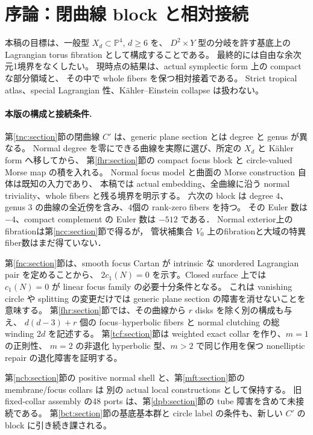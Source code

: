 \documentclass[11pt,a4paper]{article}
\theoremstyle{definition}
\newcommand{\PP}{\mathbb P}
\begin{document}
\section*{序論：閉曲線 block と相対接続}

本稿の目標は、一般型 $X_d\subset\PP^4$, $d\ge6$ を、
$D^2\times Y$ 型の分岐を許す基底上の Lagrangian torus fibration として構成することである。
最終的には自由な余次元1境界をなくしたい。
現時点の結果は、actual symplectic form 上の compact な部分領域と、
その中で whole fibers を保つ相対接着である。
Strict tropical atlas、special Lagrangian 性、Kähler--Einstein collapse は扱わない。

\paragraph{本版の構成と接続条件.}
第\ref{tnc:section}節の閉曲線 $C'$ は、generic plane section とは degree と genus が異なる。
Normal degree を零にできる曲線を実際に選び、所定の $X_d$ と K\"ahler form へ移してから、
第\ref{fhr:section}節の compact focus block と circle-valued Morse map の積を入れる。
Normal focus model と曲面の Morse construction 自体は既知の入力であり、
本稿では actual embedding、全曲線に沿う normal triviality、whole fibers と残る境界を明示する。
六次の block は degree $4$、genus $3$ の曲線の全近傍を含み、4個の rank-zero fibers を持つ。
その Euler 数は $-4$、compact complement の Euler 数は $-512$ である．
Normal exterior上のfibrationは第\ref{ncc:section}節で得るが，
管状補集合 $V_0$ 上のfibrationと大域の特異fiber数はまだ得ていない．

第\ref{fnc:section}節は、smooth focus Cartan が intrinsic な unordered Lagrangian pair を定めることから、
$2c_1(N)=0$ を示す。Closed surface 上では $c_1(N)=0$ が linear focus family の必要十分条件となる。
これは vanishing circle や splitting の変更だけでは generic plane section の障害を消せないことを意味する。
第\ref{fhr:section}節では、その曲線から $r$ disks を除く別の構成も与え、
$d(d-3)+r$ 個の focus--hyperbolic fibers と normal clutching の総 winding $2d$ を記述する。
第\ref{tcf:section}節は weighted exact collar を作り、$m=1$ の正則性、
$m=2$ の非退化 hyperbolic 型、$m>2$ で同じ作用を保つ nonelliptic repair の退化障害を証明する。

第\ref{ncb:section}節の positive normal shell と、第\ref{mft:section}節の membrane/focus collars は
別の actual local constructions として保持する。
旧 fixed-collar assembly の48 ports は、第\ref{dpb:section}節の tube 障害を含めて未接続である。
第\ref{bct:section}節の基底基本群と circle label の条件も、新しい $C'$ の block に引き続き課される。
\end{document}

